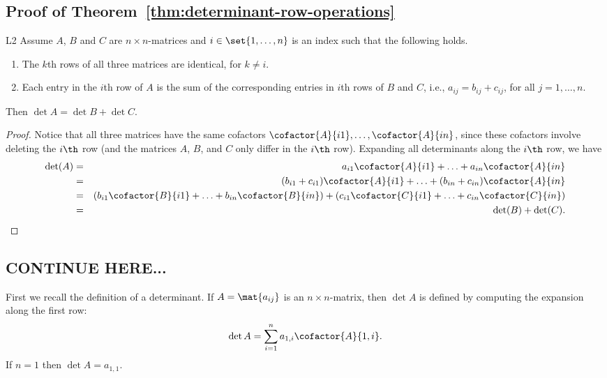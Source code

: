 \subsection{Proof of Theorem~\ref{thm:determinant-row-operations}}

\begin{lemma}{}{L2}
  Assume $A$, $B$ and $C$ are $n\times n$-matrices and
  $i\in\set{1,\ldots,n}$ is an index such that the following holds.
  \begin{enumerate}
  \item The $k$th rows of all three matrices are identical, for $k\neq i$.

  \item Each entry in the $i$th row of $A$ is the sum of the
    corresponding entries in $i$th rows of $B$ and $C$, i.e.,
    $a_{ij}=b_{ij}+c_{ij}$, for all $j=1,\ldots,n$.
  \end{enumerate}
  Then $\det A=\det B+\det C$.
\end{lemma}

\begin{proof}
  Notice that all three matrices have the same cofactors
  $\cofactor{A}{i1},\ldots,\cofactor{A}{in}$, since these cofactors
  involve deleting the $i\th$ row (and the matrices $A$, $B$, and $C$
  only differ in the $i\th$ row). Expanding all determinants along the
  $i\th$ row, we have
  \begin{eqnarray*}
    \det(A)
    &=& a_{i1}\cofactor{A}{i1} + \ldots + a_{in}\cofactor{A}{in} \\
    &=& (b_{i1}+c_{i1})\cofactor{A}{i1} + \ldots + (b_{in}+c_{in})\cofactor{A}{in} \\
    &=& (b_{i1}\cofactor{B}{i1} + \ldots + b_{in}\cofactor{B}{in})
        + (c_{i1}\cofactor{C}{i1} + \ldots + c_{in}\cofactor{C}{in}) \\
    &=& \det(B) + \det(C).
  \end{eqnarray*}
\end{proof}

\subsection{CONTINUE HERE...}

First we recall the definition of a determinant. If $A=\mat{a_{ij} }$
is an $n\times n$-matrix, then $\det A$ is defined by computing the
expansion along the first row:
\begin{equation}
  \label{E1}
  \det A=\sum_{i=1}^n a_{1,i} \cofactor{A}{1,i}.
\end{equation}
If $n=1$ then $\det A=a_{1,1}$.

